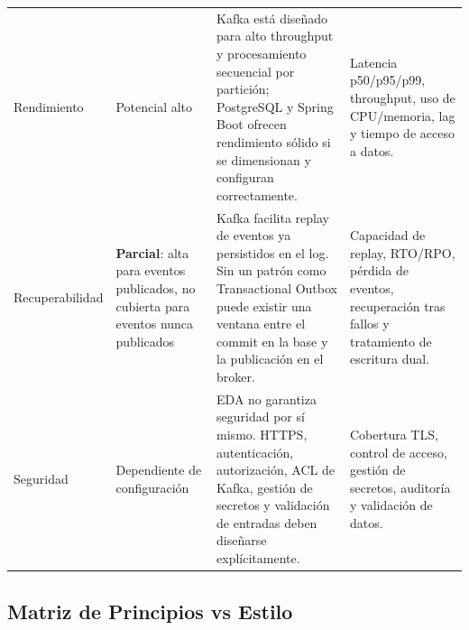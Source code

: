 \documentclass[12pt,a4paper]{article}
\begin{document}
\begin{longtable}{P{0.15\textwidth} P{0.15\textwidth} P{0.31\textwidth} P{0.30\textwidth}}
Rendimiento & Potencial alto & Kafka está diseñado para alto throughput y procesamiento secuencial por partición; PostgreSQL y Spring Boot ofrecen rendimiento sólido si se dimensionan y configuran correctamente. & Latencia p50/p95/p99, throughput, uso de CPU/memoria, lag y tiempo de acceso a datos. \\
Recuperabilidad & \textbf{Parcial}: alta para eventos publicados, no cubierta para eventos nunca publicados & Kafka facilita replay de eventos ya persistidos en el log. Sin un patrón como Transactional Outbox puede existir una ventana entre el commit en la base y la publicación en el broker. & Capacidad de replay, RTO/RPO, pérdida de eventos, recuperación tras fallos y tratamiento de escritura dual. \\
Seguridad & Dependiente de configuración & EDA no garantiza seguridad por sí mismo. HTTPS, autenticación, autorización, ACL de Kafka, gestión de secretos y validación de entradas deben diseñarse explícitamente. & Cobertura TLS, control de acceso, gestión de secretos, auditoría y validación de datos. \\
\bottomrule
\end{longtable}
\setlength{\tabcolsep}{6pt}
\normalsize

\subsection{Matriz de Principios vs Estilo}
\end{document}
